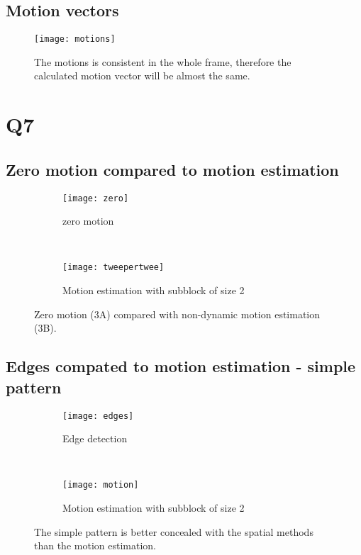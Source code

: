 \begin{appendices}
\subsection{Motion vectors}
\begin{figure}[!h]
  \centering
  \texttt{[image: motions]}
  \caption{The motions is consistent in the whole frame, therefore the calculated motion vector will be almost the same.} 
  \label{Q5:motions}
\end{figure}

\clearpage

\section{Q7}\label{Q7}
\subsection{Zero motion compared to motion estimation}
\begin{figure}[ht]
\centering
\begin{subfigure}{\textwidth}
  \centering
  \texttt{[image: zero]}
  \caption{zero motion}
\end{subfigure}\\
\begin{subfigure}{\textwidth}
  \centering
  \texttt{[image: tweepertwee]}
  \caption{Motion estimation with subblock of size 2}
\end{subfigure}
\caption{Zero motion (3A) compared with non-dynamic motion estimation (3B).}
\label{Q7:zerotwee}
\end{figure}

\clearpage

\subsection{Edges compated to motion estimation - simple pattern}
\begin{figure}[ht]
\centering
\begin{subfigure}{\textwidth}
  \centering
  \texttt{[image: edges]}
  \caption{Edge detection}
\end{subfigure}\\
\begin{subfigure}{\textwidth}
  \centering
  \texttt{[image: motion]}
  \caption{Motion estimation with subblock of size 2}
\end{subfigure}
\caption{The simple pattern is better concealed with the spatial methods than the motion estimation.}
\label{Q7:edgemotion}
\end{figure}


\end{appendices}
